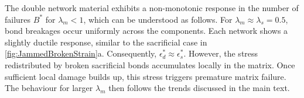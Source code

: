 \begin{subappendices}
The double network material exhibits a non-monotonic response in the number of failures $B^*$ for $\lambda_m < 1$, which can be understood as follows. For $\lambda_m \approx \lambda_s=0.5$, bond breakages occur uniformly across the components. Each network shows a slightly ductile response, similar to the sacrificial case in \cref{fig:JammedBrokenStrain}a. Consequently, $\epsilon_d^* \approx \epsilon_s^*$. However, the stress redistributed by broken sacrificial bonds accumulates locally in the matrix. Once sufficient local damage builds up, this stress triggers premature matrix failure. The behaviour for larger $\lambda_m$ then follows the trends discussed in the main text.

\end{subappendices}
